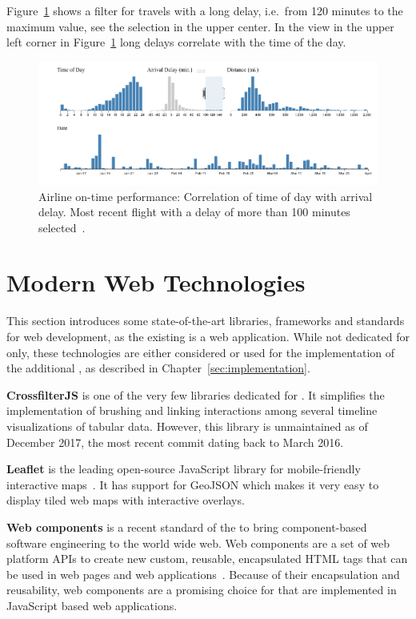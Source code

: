 Figure~\ref{fig:research:brushing-linking} shows a filter for travels with a long delay, i.e.\ from 120 minutes to the maximum value, see the selection in the upper center.
In the view in the upper left corner in Figure~\ref{fig:research:brushing-linking} long delays correlate with the time of the day.

\begin{figure}
  \centering
  \includegraphics[width=\textwidth]{figures/related-work/brushing_linking}
  \caption{Airline on-time performance: Correlation of time of day with arrival delay. Most recent flight with a delay of more than 100 minutes selected~\parencite{Bostock2017}.}
  \label{fig:research:brushing-linking}
\end{figure}

\section{Modern Web Technologies}
This section introduces some state-of-the-art libraries, frameworks and standards for web development, as the existing \visan{} is a web application.
While not dedicated for \cmvs{} only, these technologies are either considered or used for the implementation of the additional \gv{}, as described in Chapter~\ref{sec:implementation}.

\textbf{CrossfilterJS} is one of the very few libraries dedicated for \cmvs{}.
It simplifies the implementation of brushing and linking interactions among several timeline visualizations of tabular data.
However, this library is unmaintained as of December 2017, the most recent commit dating back to March 2016.

\textbf{Leaflet} is the leading open-source JavaScript library for mobile-friendly interactive maps~\parencite{Leaflet2017}.
It has support for GeoJSON which makes it very easy to display tiled web maps with interactive overlays.

\textbf{Web components} is a recent standard of the \textcite{W3C2017} to bring component-based software engineering to the world wide web.
Web components are a set of web platform APIs to create new custom, reusable, encapsulated HTML tags that can be used in web pages and web applications~\parencite{WebComponents2017}.
Because of their encapsulation and reusability, web components are a promising choice for \cmvs{} that are implemented in JavaScript based web applications.

